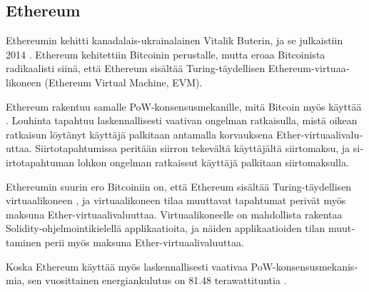 \subsection{Ethereum\label{ethereum}}
\begin{otherlanguage}{english}

Ethereumin kehitti kanadalais-ukrainalainen Vitalik Buterin, ja se julkaistiin 2014 \cite{buterin2017ethereum}. Ethereum kehitettiin Bitcoinin perustalle, mutta eroaa Bitcoinista radikaalisti siinä, että Ethereum sisältää Turing-täydellisen Ethereum-virtuaalikoneen (Ethereum Virtual Machine, EVM).

Ethereum rakentuu samalle PoW-konsensusmekanille, mitä Bitcoin myös käyttää \cite{buterin2017ethereum}. Louhinta tapahtuu laskennallisesti vaativan ongelman ratkaisulla, mistä oikean ratkaisun löytänyt käyttäjä palkitaan antamalla korvauksena Ether-virtuaalivaluuttaa. Siirtotapahtumissa peritään siirron tekevältä käyttäjältä siirtomaksu, ja siirtotapahtuman lohkon ongelman ratkaissut käyttäjä palkitaan siirtomaksulla.

Ethereumin suurin ero Bitcoiniin on, että Ethereum sisältää Turing-täydellisen virtuaalikoneen \cite{buterin2017ethereum}, ja virtuaalikoneen tilaa muuttavat tapahtumat perivät myös maksuna Ether-virtuaalivaluuttaa. Virtuaalikoneelle on mahdollista rakentaa Solidity-ohjelmointikielellä applikaatioita, ja näiden applikaatioiden tilan muuttaminen perii myös maksuna Ether-virtuaalivaluuttaa. 

Koska Ethereum käyttää myös laskennallisesti vaativaa PoW-konsensusmekanismia, sen vuosittainen energiankulutus on 81.48 terawattituntia \cite{ethereumenergy}.

\end{otherlanguage}